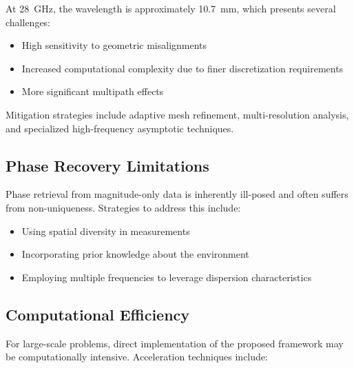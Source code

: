 \documentclass[12pt,a4paper]{article}
\begin{document}
At \SI{28}{\giga\hertz}, the wavelength is approximately \SI{10.7}{\milli\meter}, which presents several challenges:

\begin{itemize}
    \item High sensitivity to geometric misalignments
    \item Increased computational complexity due to finer discretization requirements
    \item More significant multipath effects
\end{itemize}

Mitigation strategies include adaptive mesh refinement, multi-resolution analysis, and specialized high-frequency asymptotic techniques.

\subsection{Phase Recovery Limitations}

Phase retrieval from magnitude-only data is inherently ill-posed and often suffers from non-uniqueness. Strategies to address this include:

\begin{itemize}
    \item Using spatial diversity in measurements
    \item Incorporating prior knowledge about the environment
    \item Employing multiple frequencies to leverage dispersion characteristics
\end{itemize}

\subsection{Computational Efficiency}

For large-scale problems, direct implementation of the proposed framework may be computationally intensive. Acceleration techniques include:
\end{document}
